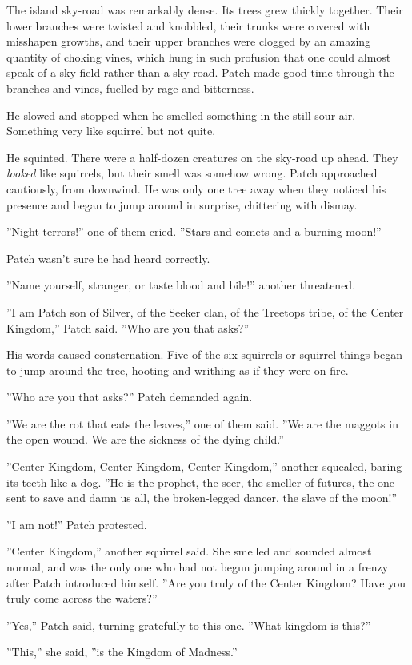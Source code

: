 \documentclass[12pt]{book}
\begin{document}
The island sky-road was remarkably dense. Its trees grew thickly together. Their lower branches were twisted and knobbled, their trunks were covered with misshapen growths, and their upper branches were clogged by an amazing quantity of choking vines, which hung in such profusion that one could almost speak of a sky-field rather than a sky-road. Patch made good time through the branches and vines, fuelled by rage and bitterness.\par
He slowed and stopped when he smelled something in the still-sour air. Something very like squirrel%
but not quite.\par
He squinted. There were a half-dozen creatures on the sky-road up ahead. They {\it looked} like squirrels, but their smell was somehow wrong. Patch approached cautiously, from downwind. He was only one tree away when they noticed his presence and began to jump around in surprise, chittering with dismay.\par
''Night terrors!'' one of them cried. ''Stars and comets and a burning moon!''\par
Patch wasn't sure he had heard correctly.\par
''Name yourself, stranger, or taste blood and bile!'' another threatened.\par
 ''I am Patch son of Silver, of the Seeker clan, of the Treetops tribe, of the Center Kingdom,'' Patch said. ''Who are you that asks?''\par
His words caused consternation. Five of the six squirrels %
 or squirrel-things %
 began to jump around the tree, hooting and writhing as if they were on fire.\par
''Who are you that asks?'' Patch demanded again.\par
''We are the rot that eats the leaves,'' one of them said. ''We are the maggots in the open wound. We are the sickness of the dying child.''\par
''Center Kingdom, Center Kingdom, Center Kingdom,'' another squealed, baring its teeth like a dog. ''He is the prophet, the seer, the smeller of futures, the one sent to save and damn us all, the broken-legged dancer, the slave of the moon!''\par
''I am not!'' Patch protested.\par
''Center Kingdom,'' another squirrel said. She smelled and sounded almost normal, and was the only one who had not begun jumping around in a frenzy after Patch introduced himself. ''Are you truly of the Center Kingdom? Have you truly come across the waters?''\par
''Yes,'' Patch said, turning gratefully to this one. ''What kingdom is this?''\par
''This,'' she said, ''is the Kingdom of Madness.''\par
\end{document}

